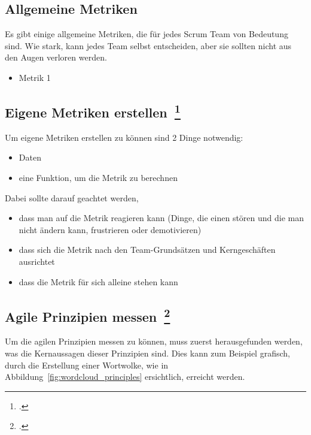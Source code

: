 \subsection{Allgemeine Metriken}

Es gibt einige allgemeine Metriken, die für jedes Scrum Team von Bedeutung sind.
Wie stark, kann jedes Team selbst entscheiden, aber sie sollten nicht aus den Augen verloren werden.

\begin{itemize}
  \item Metrik 1
\end{itemize}

\subsection[Eigene Metriken erstellen]{Eigene Metriken erstellen~\footcite[vgl.][S.127ff]{davis_agile_2015}}

Um eigene Metriken erstellen zu können sind 2 Dinge notwendig:
\begin{itemize}
  \item Daten
  \item eine Funktion, um die Metrik zu berechnen
\end{itemize}

Dabei sollte darauf geachtet werden,
\begin{itemize}
  \item dass man auf die Metrik reagieren kann (Dinge, die einen stören und die man nicht ändern kann, frustrieren oder demotivieren)
  \item dass sich die Metrik nach den Team-Grundsätzen und Kerngeschäften ausrichtet
  \item dass die Metrik für sich alleine stehen kann
\end{itemize}

\subsection[Agile Prinzipien messen]{Agile Prinzipien messen~\footcite[vgl.][S.201ff]{davis_agile_2015}}

Um die agilen Prinzipien messen zu können, muss zuerst herausgefunden werden, was die Kernaussagen dieser Prinzipien sind.
Dies kann zum Beispiel grafisch, durch die Erstellung einer Wortwolke, wie in Abbildung~\ref{fig:wordcloud_principles} ersichtlich, erreicht werden.

